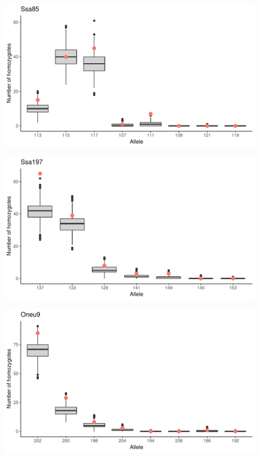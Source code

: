 \documentclass[a4paper]{scrartcl}\usepackage[]{graphicx}\usepackage[]{color}
\makeatletter
\def\maxwidth{ %
  \ifdim\Gin@nat@width>\linewidth
    \linewidth
  \else
    \Gin@nat@width
  \fi
}
\newenvironment{knitrout}{}{} %
\makeatother
\begin{document}
\noindent
\begin{knitrout}
\color{fgcolor}
\includegraphics[width=\maxwidth]{PopGenReport_Hatchery-null_all-1} 

\includegraphics[width=\maxwidth]{PopGenReport_Hatchery-null_all-2} 

\includegraphics[width=\maxwidth]{PopGenReport_Hatchery-null_all-3} 


\end{knitrout}
\end{document}
